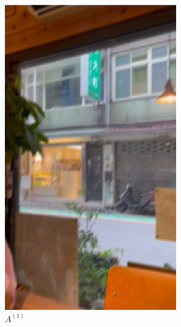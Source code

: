 \documentclass[12pt]{article}
\theoremstyle{definition}
\begin{document}
\begin{figure}[ht]
     \centering
     \begin{subfigure}[b]{0.3\textwidth}
         \centering
         \includegraphics[width=\textwidth]{ch3_figures/video_after_1.png}
         \caption{$A^{(1)}$}
         \label{fig:video_after_1}
     \end{subfigure}
     \hfill
     \begin{subfigure}[b]{0.3\textwidth}
         \centering

\end{subfigure}
\end{figure}
\end{document}
